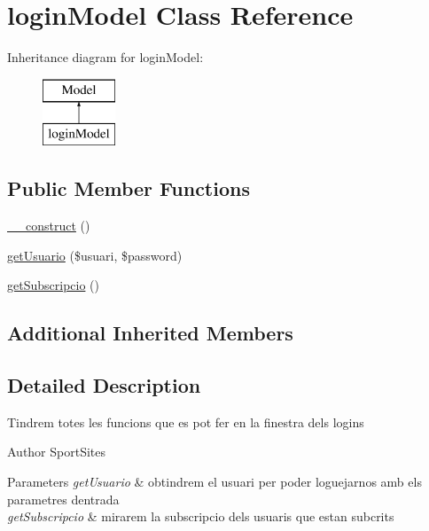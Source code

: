 \hypertarget{classlogin_model}{}\section{login\+Model Class Reference}
\label{classlogin_model}
Inheritance diagram for login\+Model\+:\begin{figure}[H]
\begin{center}
\leavevmode
\includegraphics[height=2.000000cm]{classlogin_model}
\end{center}
\end{figure}
\subsection*{Public Member Functions}
\begin{DoxyCompactItemize}
\item 
\hyperlink{classlogin_model_a095c5d389db211932136b53f25f39685}{\+\_\+\+\_\+construct} ()
\item 
\hyperlink{classlogin_model_a02829b1d3c54336167159abb5370363e}{get\+Usuario} (\$usuari, \$password)
\item 
\hyperlink{classlogin_model_a81459b2bd5a5711018092ae00fdc6e15}{get\+Subscripcio} ()
\end{DoxyCompactItemize}
\subsection*{Additional Inherited Members}


\subsection{Detailed Description}
Tindrem totes les funcions que es pot fer en la finestra dels logins

\begin{DoxyAuthor}{Author}
Sport\+Sites 
\end{DoxyAuthor}

\begin{DoxyParams}{Parameters}
{\em get\+Usuario} & obtindrem el usuari per poder loguejarnos amb els parametres d\textquotesingle{}entrada \\
\hline
{\em get\+Subscripcio} & mirarem la subscripcio dels usuaris que estan subcrits \\
\hline
\end{DoxyParams}


